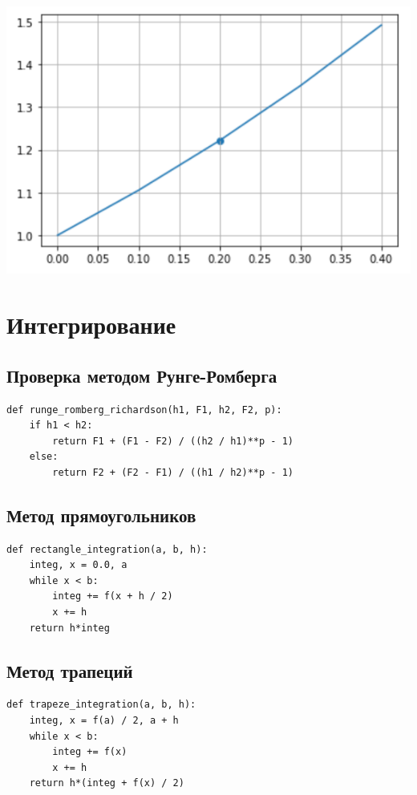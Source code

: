\documentclass[pdf, unicode, 12pt, a4paper,oneside,fleqn]{article}
\begin{document}
\includegraphics[scale=0.5]{data4.png}

\section{Интегрирование}

\subsection{Проверка методом Рунге-Ромберга}

\begin{lstlisting}
def runge_romberg_richardson(h1, F1, h2, F2, p):
    if h1 < h2:
        return F1 + (F1 - F2) / ((h2 / h1)**p - 1)
    else:
        return F2 + (F2 - F1) / ((h1 / h2)**p - 1)
\end{lstlisting}

\subsection{Метод прямоугольников}

\begin{lstlisting}
def rectangle_integration(a, b, h):
    integ, x = 0.0, a
    while x < b:
        integ += f(x + h / 2)
        x += h
    return h*integ
\end{lstlisting}

\subsection{Метод трапеций}

\begin{lstlisting}
def trapeze_integration(a, b, h):
    integ, x = f(a) / 2, a + h
    while x < b:
        integ += f(x)
        x += h
    return h*(integ + f(x) / 2)
\end{lstlisting}
\end{document}
